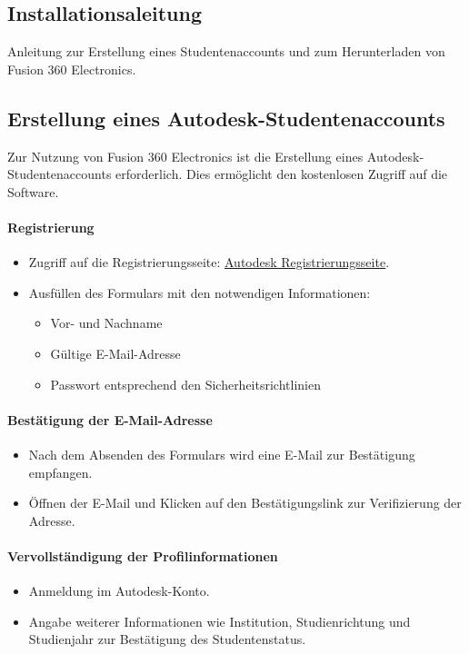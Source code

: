 \subsection{Installationsaleitung}
Anleitung zur Erstellung eines Studentenaccounts und zum Herunterladen von Fusion 360 Electronics.

\subsection*{Erstellung eines Autodesk-Studentenaccounts}

Zur Nutzung von Fusion 360 Electronics ist die Erstellung eines Autodesk-Studentenaccounts erforderlich. Dies ermöglicht den kostenlosen Zugriff auf die Software.

\paragraph{ Registrierung}
\begin{itemize}
	\item Zugriff auf die Registrierungsseite: \href{https://accounts.autodesk.com/register?resume=/as/fMRyxxIM12/resume/as/authorization.ping&ack=uWlmiJuqQqVaAQjGdojc8Qxit4KVdorZ}{\underline{Autodesk Registrierungsseite}}.
	\item Ausfüllen des Formulars mit den notwendigen Informationen:
	\begin{itemize}
		\item Vor- und Nachname
		\item Gültige E-Mail-Adresse
		\item Passwort entsprechend den Sicherheitsrichtlinien
	\end{itemize}
\end{itemize}

\paragraph{ Bestätigung der E-Mail-Adresse}
\begin{itemize}
	\item Nach dem Absenden des Formulars wird eine E-Mail zur Bestätigung empfangen.
	\item Öffnen der E-Mail und Klicken auf den Bestätigungslink zur Verifizierung der Adresse.
\end{itemize}

\paragraph{ Vervollständigung der Profilinformationen}
\begin{itemize}
	\item Anmeldung im Autodesk-Konto.
	\item Angabe weiterer Informationen wie Institution, Studienrichtung und Studienjahr zur Bestätigung des Studentenstatus.
\end{itemize}

